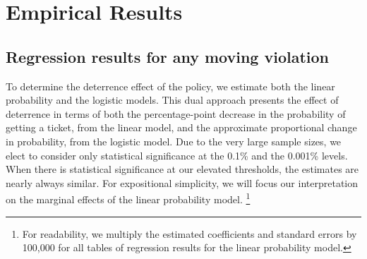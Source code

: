 \section{Empirical Results}
\label{sec:Empirical}


\subsection{Regression results for any moving violation}
\label{sec:Empirical_all}

To determine the deterrence effect of the policy, we estimate both the linear probability and the logistic models. 
% 
This dual approach presents the effect of deterrence in terms of 
both the percentage-point decrease in the probability of getting a ticket, 
from the linear model, 
and the approximate proportional change in probability, 
from the logistic model.  
%
Due to the very large sample sizes, 
we elect to consider only statistical significance at the 0.1\% and the 0.001\% levels. 
%
When there is statistical significance at our elevated thresholds, 
the estimates are nearly always similar. 
For expositional simplicity, we will focus our interpretation on 
the marginal effects of the linear probability model.%
\footnote{%
For readability, we multiply the estimated coefficients and standard errors by 100,000 
for all tables of regression results for the linear probability model.
% 
}




